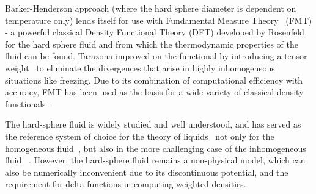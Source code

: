 \documentclass[letterpaper,twocolumn,amsmath,amssymb,prb]{revtex4-1}
\begin{document}
Barker-Henderson approach (where the hard sphere diameter is dependent
on temperature only) lends itself for use with 
Fundamental Measure Theory~\cite{rosenfeld1989, rosenfeld1997} (FMT) -  
a powerful classical Density
Functional Theory (DFT) developed by Rosenfeld for the hard sphere fluid
and from which the thermodynamic properties of the fluid can be found.
Tarazona improved on the functional by introducing a tensor 
weight~\cite{tarazona2000}
to eliminate 
the divergences 
that arise in highly inhomogeneous situations like freezing.
Due to its combination of computational efficiency with accuracy, 
FMT has been used as the
basis for a wide variety of classical density
functionals~\cite{cuesta1997dimensional, roth2002whitebear, 
hansen2009fundamental, 
marechal2013density, hughes2013classical, krebs2014improved}.
  
The hard-sphere fluid is widely studied and well understood, and
has served as the reference system of choice for the theory of
liquids~\cite{gil-villegas-1997-SAFT-VR, clark2006developing,
  lafitte2013accurate, Nezbeda2022referencefluid} not only for the homogeneous
fluid~\cite{carnahan1969equation}, but also in the more challenging
case of the inhomogeneous fluid
~\cite{shen2020inhomogeneous, sermoud2021inhomogeneous, shen2022inhomogeneous, 
bultmann2022inhomogeneous}.
However, the hard-sphere fluid remains a
non-physical model, which can also be numerically inconvenient due to its
discontinuous potential, and the requirement for delta functions in
computing weighted densities.
\end{document}
